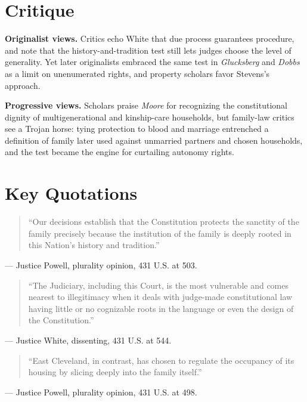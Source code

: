 \documentclass[12pt]{article}
\begin{document}
\section{Critique}

\textbf{Originalist views.} Critics echo White that due process guarantees procedure, and note that the history-and-tradition test still lets judges choose the level of generality. Yet later originalists embraced the same test in \textit{Glucksberg} and \textit{Dobbs} as a limit on unenumerated rights, and property scholars favor Stevens's approach.

\textbf{Progressive views.} Scholars praise \textit{Moore} for recognizing the constitutional dignity of multigenerational and kinship-care households, but family-law critics see a Trojan horse: tying protection to blood and marriage entrenched a definition of family later used against unmarried partners and chosen households, and the test became the engine for curtailing autonomy rights.

\section{Key Quotations}

\begin{quote}
``Our decisions establish that the Constitution protects the sanctity of the family precisely because the institution of the family is deeply rooted in this Nation's history and tradition.''
\end{quote}
\noindent --- Justice Powell, plurality opinion, 431 U.S. at 503.

\begin{quote}
``The Judiciary, including this Court, is the most vulnerable and comes nearest to illegitimacy when it deals with judge-made constitutional law having little or no cognizable roots in the language or even the design of the Constitution.''
\end{quote}
\noindent --- Justice White, dissenting, 431 U.S. at 544.

\begin{quote}
``East Cleveland, in contrast, has chosen to regulate the occupancy of its housing by slicing deeply into the family itself.''
\end{quote}
\noindent --- Justice Powell, plurality opinion, 431 U.S. at 498.
\end{document}
